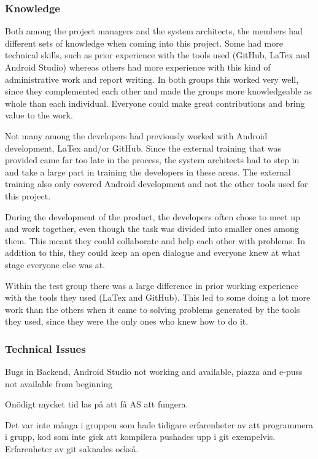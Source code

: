 \documentclass[a4paper]{article}
\begin{document}
\subsubsection{Knowledge}
Both among the project managers and the system architects, the members had different sets of knowledge when coming into this project. Some had more technical skills, such as prior experience with the tools used (GitHub, LaTex and Android Studio) whereas others had more experience with this kind of administrative work and report writing. In both groups this worked very well, since they complemented each other and made the groups more knowledgeable as whole than each individual. Everyone could make great contributions and bring value to the work.

Not many among the developers had previously worked with Android development, LaTex and/or GitHub. Since the external training that was provided came far too late in the process, the system architects had to step in and take a large part in training the developers in these areas. The external training also only covered Android development and not the other tools used for this project.

During the development of the product, the developers often chose to meet up and work together, even though the task was divided into smaller ones among them. This meant they could collaborate and help each other with problems. In addition to this, they could keep an open dialogue and everyone knew at what stage everyone else was at.

Within the test group there was a large difference in prior working experience with the tools they used (LaTex and GitHub). This led to some doing a lot more work than the others when it came to solving problems generated by the tools they used, since they were the only ones who knew how to do it.



\subsubsection{Technical Issues}
Bugs in Backend, Android Studio not working and available, piazza and e-puss not available from beginning

Onödigt mycket tid las på att få AS att fungera.

Det var inte många i gruppen som hade tidigare erfarenheter av att programmera i grupp, kod som inte gick att kompilera pushades upp i git exempelvis. Erfarenheter av git saknades också.
\end{document}
